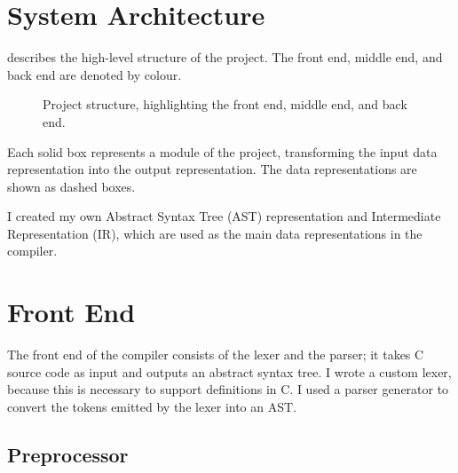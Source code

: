 \documentclass[00-main.tex]{subfiles}
\begin{document}
\section{System Architecture}

 describes the high-level structure of the project. The \textcolor{frontendcolor}{front end}, \textcolor{middleendcolor}{middle end}, and \textcolor{backendcolor}{back end} are denoted by colour.

\begin{figure}[H]
  \centering
  \caption{Project structure, highlighting the \textcolor{frontendcolor}{front end}, \textcolor{middleendcolor}{middle end}, and \textcolor{backendcolor}{back end}.}
  \label{fig:project flowchart}
\end{figure}

Each solid box represents a module of the project, transforming the input data representation into the output representation.
The data representations are shown as dashed boxes.

I created my own Abstract Syntax Tree (AST) representation and Intermediate Representation (IR), which are used as the main data representations in the compiler.


\section{Front End}


The front end of the compiler consists of the lexer and the parser; it takes C source code as input and outputs an abstract syntax tree.
I wrote a custom lexer, because this is necessary to support  definitions in C\@.
I used a parser generator to convert the tokens emitted by the lexer into an AST\@.

\subsection{Preprocessor}
\end{document}
